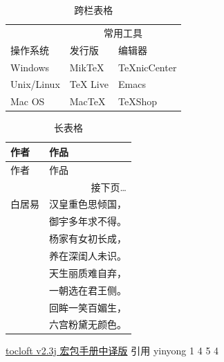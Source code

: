 \documentclass[12pt]{ctexart} %
\begin{document}
\begin{table}[H]
    \caption{跨栏表格}
    \centering
    \begin{tabular}{lll}
        \toprule
        & \multicolumn{2}{c}{常用工具} \\
        \cmidrule{2-3}
        操作系统 & 发行版 & 编辑器 \\
        \midrule
        Windows & MikTeX & TeXnicCenter \\
        Unix/Linux & TeX Live & Emacs \\
        Mac OS & MacTeX & TeXShop \\
        \bottomrule
    \end{tabular}
\end{table}

\begin{longtable}{ll}
\caption{长表格} \\
\toprule[2pt]
作者 & 作品 \\
\midrule
\endfirsthead
\midrule
作者 & 作品 \\
\midrule
\endhead
\midrule
\multicolumn{2}{r}{接下页\dots} \\%
\endfoot
\bottomrule[2pt]
\endlastfoot
白居易 & 汉皇重色思倾国，\\
& 御宇多年求不得。\\
& 杨家有女初长成，\\
& 养在深闺人未识。\\
& 天生丽质难自弃，\\
& 一朝选在君王侧。\\
& 回眸一笑百媚生，\\
& 六宫粉黛无颜色。\\
\end{longtable}

\newpage
\href{https://www.latexstudio.net/index/details/index/mid/1547.html}{tocloft v2.3j 宏包手册中译版}%
引用\cite{Ren2015Faster}
yinyong\cite{1998Electrostatic}
1\cite{1956The}
4\cite{1987Incidence}
5\cite{2009Green}
4\cite{韩中庚2009数学建模方法及其应用}

\end{document}
